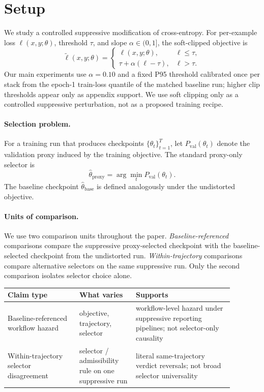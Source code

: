 \section{Setup}
We study a controlled suppressive modification of cross-entropy.
For per-example loss $\ell(x,y;\theta)$, threshold $\tau$, and slope $\alpha \in (0,1]$, the soft-clipped objective is
\begin{equation}
\tilde{\ell}(x,y;\theta)=
\begin{cases}
\ell(x,y;\theta), & \ell \le \tau,\\
\tau + \alpha(\ell-\tau), & \ell > \tau.
\end{cases}
\label{eq:softclip}
\end{equation}
Our main experiments use $\alpha=0.10$ and a fixed P95 threshold calibrated once per stack from the epoch-1 train-loss quantile of the matched baseline run; higher clip thresholds appear only as appendix support.
We use soft clipping only as a controlled suppressive perturbation, not as a proposed training recipe.

\paragraph{Selection problem.}
For a training run that produces checkpoints $\{\theta_t\}_{t=1}^T$, let $P_{\mathrm{val}}(\theta_t)$ denote the validation proxy induced by the training objective.
The standard proxy-only selector is
\begin{equation}
\hat{\theta}_{\mathrm{proxy}}=\arg\min_t P_{\mathrm{val}}(\theta_t).
\end{equation}
The baseline checkpoint $\hat{\theta}_{\mathrm{base}}$ is defined analogously under the undistorted objective.

\paragraph{Units of comparison.}
We use two comparison units throughout the paper.
\emph{Baseline-referenced} comparisons compare the suppressive proxy-selected checkpoint with the baseline-selected checkpoint from the undistorted run.
\emph{Within-trajectory} comparisons compare alternative selectors on the same suppressive run.
Only the second comparison isolates selector choice alone.

\begin{center}
\footnotesize
\begin{tabular}{@{}p{0.28\linewidth}p{0.22\linewidth}p{0.38\linewidth}@{}}
\toprule
Claim type & What varies & Supports \\
\midrule
Baseline-referenced workflow hazard & objective, trajectory, selector & workflow-level hazard under suppressive reporting pipelines; not selector-only causality \\
Within-trajectory selector disagreement & selector / admissibility rule on one suppressive run & literal same-trajectory verdict reversals; not broad selector universality \\
\bottomrule
\end{tabular}
\end{center}

